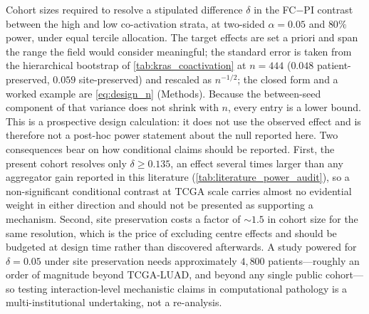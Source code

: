\begin{flushleft}\footnotesize
Cohort sizes required to resolve a stipulated difference $\delta$ in the
FC${-}$PI contrast between the high and low co-activation strata, at two-sided
$\alpha\!=\!0.05$ and $80\%$ power, under equal tercile allocation.
The target effects are set a priori and span the range the field would
consider meaningful; the standard error is taken from the hierarchical
bootstrap of \cref{tab:kras_coactivation} at $n\!=\!444$
($0.048$ patient-preserved, $0.059$ site-preserved) and rescaled as
$n^{-1/2}$; the closed form and a worked example are
\cref{eq:design_n} (Methods). Because the between-seed component of that
variance does not shrink with $n$, every entry is a lower bound. This is a prospective design calculation: it does not use the
observed effect and is therefore not a post-hoc power statement about the
null reported here.
Two consequences bear on how conditional claims should be reported. First,
the present cohort resolves only $\delta\!\geq\!0.135$, an effect several times
larger than any aggregator gain reported in this literature
(\cref{tab:literature_power_audit}), so a
non-significant conditional contrast at TCGA scale carries almost no
evidential weight in either direction and should not be presented as
supporting a mechanism. Second, site preservation costs a factor of
${\sim}1.5$ in cohort size for the same resolution, which is the price of
excluding centre effects and should be budgeted at design time rather than
discovered afterwards.
A study powered for $\delta\!=\!0.05$ under site preservation needs
approximately $4{,}800$ patients---roughly an order of magnitude beyond
TCGA-LUAD, and beyond any single public cohort---so testing interaction-level
mechanistic claims in computational pathology is a multi-institutional
undertaking, not a re-analysis.
\end{flushleft}
